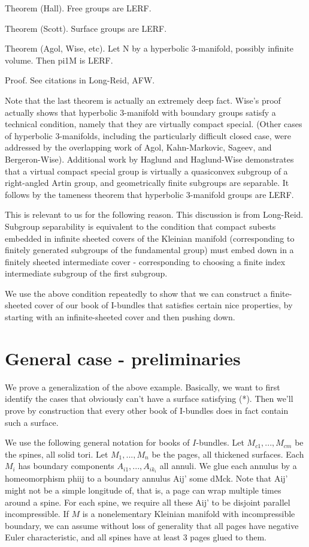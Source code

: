 \documentclass[12pt]{amsart}
\theoremstyle{definition}
\theoremstyle{remark}
\begin{document}
Theorem (Hall). Free groups are LERF.

Theorem (Scott). Surface groups are LERF.

Theorem (Agol, Wise, etc). Let N by a hyperbolic 3-manifold, possibly infinite
volume. Then pi1M is LERF.

Proof. See citations in Long-Reid, AFW.

Note that the last theorem is actually an extremely deep fact. Wise's proof
actually shows that hyperbolic 3-manifold with boundary groups satisfy
a technical condition, namely that they are virtually compact special. (Other
cases of hyperbolic 3-manifolds, including the particularly difficult closed
case, were addressed by the overlapping work of Agol, Kahn-Markovic, Sageev,
and Bergeron-Wise).  Additional work by Haglund and Haglund-Wise demonstrates
that a virtual compact special group is virtually a quasiconvex subgroup of
a right-angled Artin group, and geometrically finite subgroups are separable.
It follows by the tameness theorem that hyperbolic 3-manifold groups are LERF.

This is relevant to us for the following reason. This discussion is from
Long-Reid. Subgroup separability is equivalent to the condition that compact
subests embedded in infinite sheeted covers of the Kleinian manifold
(corresponding to finitely generated subgroups of the fundamental group) must
embed down in a finitely sheeted intermediate cover - corresponding to choosing
a finite index intermediate subgroup of the first subgroup.


We use the above condition repeatedly to show that we can construct
a finite-sheeted cover of our book of I-bundles that satisfies certain nice
properties, by starting with an infinite-sheeted cover and then pushing down.

\section{General case - preliminaries}

We prove a generalization of the above example. Basically, we want to first
identify the cases that obviously can't have a surface satisfying (*). Then
we'll prove by construction that every other book of I-bundles does in fact
contain such a surface.

We use the following general notation for books of $I$-bundles. Let
$M_{c1},...,M_{cm}$ be the spines, all solid tori. Let $M_1,...,M_n$ be the
pages, all thickened surfaces. Each $M_i$ has boundary components
$A_{i1},...,A_{ik_i}$ all annuli. We glue each annulus by a homeomorphism phiij
to a boundary annulus Aij' some dMck. Note that Aij' might not be a simple
longitude of, that is, a page can wrap multiple times around a spine. For each
spine, we require all these Aij' to be disjoint parallel incompressible.  If
$M$ is a nonelementary Kleinian manifold with incompressible boundary, we can
assume without loss of generality that all pages have negative Euler
characteristic, and all spines have at least 3 pages glued to them.
\end{document}
